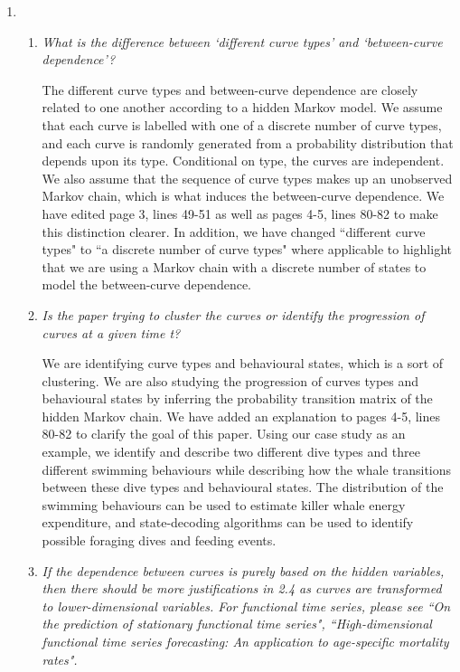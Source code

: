 \documentclass{article}
\begin{document}
\begin{enumerate}
    \item 
    \begin{enumerate}
        \item \textit{What is the difference between `different curve types' and `between-curve dependence'?} 
        
        The different curve types and between-curve dependence are closely related to one another according to a hidden Markov model. We assume that each curve is labelled with one of a discrete number of curve types, and each curve is randomly generated from a probability distribution that depends upon its type. Conditional on type, the curves are independent. We also assume that the sequence of curve types makes up an unobserved Markov chain, which is what induces the between-curve dependence. We have edited page 3, lines 49-51 as well as pages 4-5, lines 80-82 to make this distinction clearer. In addition, we have changed ``different curve types" to ``a discrete number of curve types" where applicable to highlight that we are using a Markov chain with a discrete number of states to model the between-curve dependence. 
        
        \item \textit{Is the paper trying to cluster the curves or identify the progression of curves at a given time t?} 
        
        We are identifying curve types and behavioural states, which is a sort of clustering. We are also studying the progression of curves types and behavioural states by inferring the probability transition matrix of the hidden Markov chain. We have added an explanation to pages 4-5, lines 80-82 to clarify the goal of this paper. Using our case study as an example, we identify and describe two different dive types and three different swimming behaviours while describing how the whale transitions between these dive types and behavioural states. The distribution of the swimming behaviours can be used to estimate killer whale energy expenditure, and state-decoding algorithms can be used to identify possible foraging dives and feeding events.
        
        \item \textit{If the dependence between curves is purely based on the hidden variables, then there should be more justifications in 2.4 as curves are transformed to lower-dimensional variables. For functional time series, please see ``On the prediction of stationary functional time series", ``High-dimensional functional time series forecasting: An application to age-specific mortality rates".} 
        

\end{enumerate}
\end{enumerate}
\end{document}
